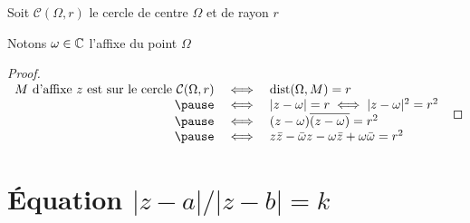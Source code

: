 \begin{frame}
\begin{minipage}{0.65\linewidth}
Soit $\mathcal{C}(\Omega,r)$ le {\color{blue} cercle} de centre $\Omega$ et de rayon $r$

Notons $\omega \in \mathbb{C}$ l'affixe du point $\Omega$
\end{minipage}
\begin{minipage}{0.34\linewidth}
\hspace*{-2ex}
\vspace*{-4ex}
\end{minipage}




\pause
\begin{proof}
$
\begin{array}{rcl}
M \text{ d'affixe } z \text{ est sur le cercle } \mathcal{C}(\Omega,r)
&\iff & \mathrm{dist}(\Omega,M)=r \\
\pause
&\iff & |z-\omega|=r \iff |z-\omega|^2=r^2 \\
\pause
&\iff& (z-\omega)\overline{(z-\omega)}=r^2\\
\pause
&\iff& z\bar z - \bar \omega z - \omega \bar z + \omega\bar \omega= r^2
\end{array}$
\end{proof}
\pause

\end{frame}


\section{\'Equation ${|z-a|}/{|z-b|}=k$}

